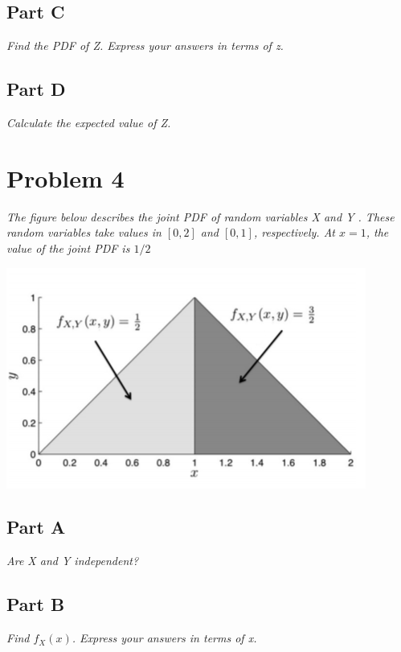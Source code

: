 \documentclass{article}
\begin{document}
\subsection*{Part C}

\textit{Find the PDF of Z. Express your answers in terms of z.}

\subsection*{Part D}

\textit{Calculate the expected value of Z.}

\section*{Problem 4}

\textit{The figure below describes the joint PDF of random variables X and Y
. These random variables take values in $[0, 2]$ and $[0, 1]$, respectively.
At $x = 1$, the value of the joint PDF is $1/2$}

\begin{center}
    \includegraphics[scale=1]{Images/P4.PNG}
\end{center}

\subsection*{Part A}

\textit{Are X and Y independent?}

\subsection*{Part B}

\textit{Find $ f_X(x) $. Express your answers in terms of x.}
\end{document}
